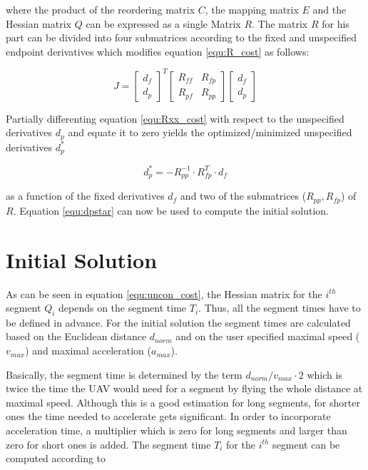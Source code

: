 where the product of the reordering matrix $C$, the mapping matrix $E$ and the Hessian matrix $Q$ can be expressed as a single Matrix $R$. The matrix $R$ for his part can be divided into four submatrices according to the fixed and unspecified endpoint derivatives which modifies equation \ref{equ:R_cost} as follows:

\begin{equation}
J =
\begin{bmatrix}
   d_f \\
  d_p
\end{bmatrix}^T
\begin{bmatrix}
   R_{ff} & R_{fp} \\
  R_{pf} & R_{pp}
\end{bmatrix}
\begin{bmatrix}
   d_f \\
  d_p
\end{bmatrix}
\label{equ:Rxx_cost}
\end{equation}

Partially differenting equation \ref{equ:Rxx_cost} with respect to the unspecified derivatives $d_p$ and equate it to zero yields the optimized/minimized unspecified derivatives $d_p^*$ 

\begin{equation}
d_p^* = - R_{pp}^{-1} \cdot R_{fp}^T \cdot d_f
\label{equ:dpstar}
\end{equation}

as a function of the fixed derivatives $d_f$ and two of the submatrices ($R_{pp}, R_{fp}$) of $R$. Equation \ref{equ:dpstar} can now be used to compute the initial solution. 


\section{Initial Solution}\label{sec:initialSolution}

As can be seen in equation \ref{equ:uncon_cost}, the Hessian matrix for the  $ i^{th}$ segment $Q_i$ depends on the segment time $T_i$. Thus, all the segment times have to be defined in advance. For the initial solution the segment times are calculated based on the Euclidean distance $d_{norm}$ and on the user specified maximal speed ($v_{max}$) and maximal acceleration ($a_{max}$). \newline

Basically, the segment time is determined by the term $d_{norm}/v_{max} \cdot 2$ which is twice the time the UAV would need for a segment by flying the whole distance at maximal speed. Although this is a good estimation for long segments, for shorter ones the time needed to accelerate gets significant. In order to incorporate acceleration time, a multiplier which is zero for long segments and larger than zero for short ones is added. The segment time $T_i$ for the $i^{th}$ segment can be computed according to 

